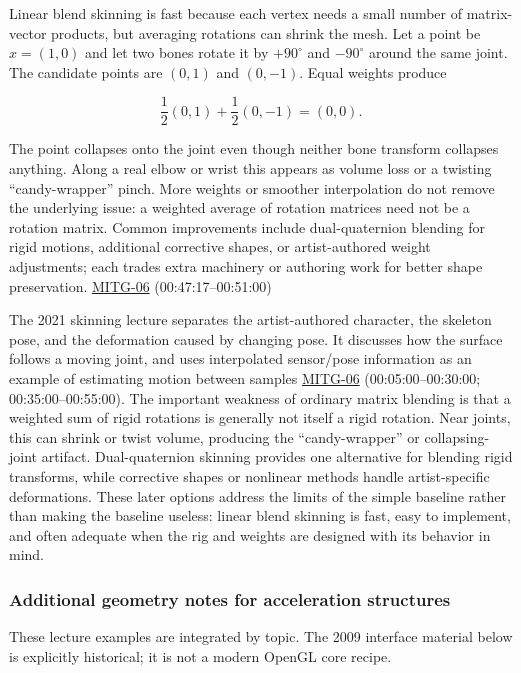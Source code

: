Linear blend skinning is fast because each vertex needs a small number of matrix-vector products, but averaging rotations can shrink the mesh. Let a point be \(x=(1,0)\) and let two bones rotate it by \(+90^\circ\) and \(-90^\circ\) around the same joint. The candidate points are \((0,1)\) and \((0,-1)\). Equal weights produce

\[
\frac12(0,1)+\frac12(0,-1)=(0,0).
\]

The point collapses onto the joint even though neither bone transform collapses anything. Along a real elbow or wrist this appears as volume loss or a twisting ``candy-wrapper'' pinch. More weights or smoother interpolation do not remove the underlying issue: a weighted average of rotation matrices need not be a rotation matrix. Common improvements include dual-quaternion blending for rigid motions, additional corrective shapes, or artist-authored weight adjustments; each trades extra machinery or authoring work for better shape preservation. \hyperref[04-visual-computing-ii-ch036]{MITG-06} (00:47:17--00:51:00)

The 2021 skinning lecture separates the artist-authored character, the skeleton pose, and the deformation caused by changing pose. It discusses how the surface follows a moving joint, and uses interpolated sensor/pose information as an example of estimating motion between samples \hyperref[04-visual-computing-ii-ch036]{MITG-06} (00:05:00--00:30:00; 00:35:00--00:55:00). The important weakness of ordinary matrix blending is that a weighted sum of rigid rotations is generally not itself a rigid rotation. Near joints, this can shrink or twist volume, producing the ``candy-wrapper'' or collapsing-joint artifact. Dual-quaternion skinning provides one alternative for blending rigid transforms, while corrective shapes or nonlinear methods handle artist-specific deformations. These later options address the limits of the simple baseline rather than making the baseline useless: linear blend skinning is fast, easy to implement, and often adequate when the rig and weights are designed with its behavior in mind.

\subsubsection{Additional geometry notes for acceleration structures}\label{additional-geometry-notes-for-acceleration-structures}

These lecture examples are integrated by topic. The 2009 interface material below is explicitly historical; it is not a modern OpenGL core recipe.

